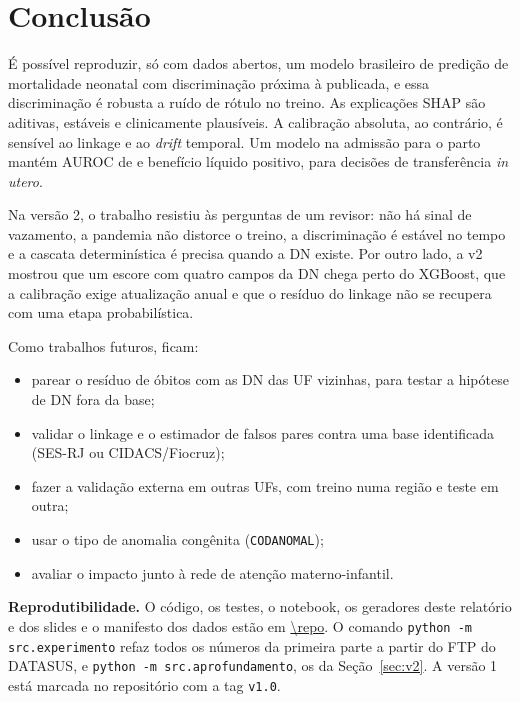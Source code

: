 \documentclass[12pt]{article}
\begin{document}
\section{Conclusão}

É possível reproduzir, só com dados abertos, um modelo brasileiro de predição de mortalidade neonatal com discriminação próxima à publicada, e essa discriminação é robusta a ruído de rótulo no treino. As explicações SHAP são aditivas, estáveis e clinicamente plausíveis. A calibração absoluta, ao contrário, é sensível ao linkage e ao \emph{drift} temporal. Um modelo na admissão para o parto mantém AUROC de \BXgbAuroc{} e benefício líquido positivo, para decisões de transferência \emph{in utero}.

Na versão 2, o trabalho resistiu às perguntas de um revisor: não há sinal de vazamento, a pandemia não distorce o treino, a discriminação é estável no tempo e a cascata determinística é precisa quando a DN existe. Por outro lado, a v2 mostrou que um escore com quatro campos da DN chega perto do XGBoost, que a calibração exige atualização anual e que o resíduo do linkage não se recupera com uma etapa probabilística.

Como trabalhos futuros, ficam:
\begin{itemize}
  \item parear o resíduo de óbitos com as DN das UF vizinhas, para testar a hipótese de DN fora da base;
  \item validar o linkage e o estimador de falsos pares contra uma base identificada (SES-RJ ou CIDACS/Fiocruz);
  \item fazer a validação externa em outras UFs, com treino numa região e teste em outra;
  \item usar o tipo de anomalia congênita (\texttt{CODANOMAL});
  \item avaliar o impacto junto à rede de atenção materno-infantil.
\end{itemize}

\textbf{Reprodutibilidade.} O código, os testes, o notebook, os geradores deste relatório e dos slides e o manifesto dos dados estão em \url{\repo}. O comando \texttt{python -m src.experimento} refaz todos os números da primeira parte a partir do FTP do DATASUS, e \texttt{python -m src.aprofundamento}, os da Seção~\ref{sec:v2}. A versão 1 está marcada no repositório com a tag \texttt{v1.0}.



\end{document}
